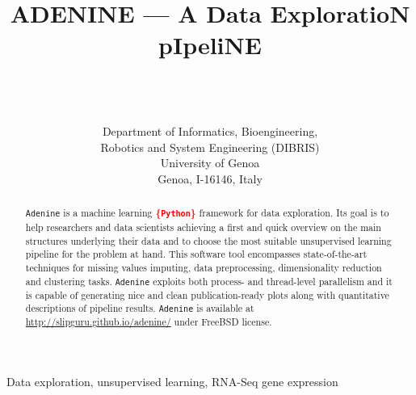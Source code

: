 \documentclass[twoside,11pt]{article}
\makeatletter
\newcommand{\ade}{\texttt{Adenine}\@\xspace}
\newcommand{\py}{\texttt{Python}\@\xspace}
\newcommand{\todo}[1]{\textcolor{red}{{\bf \{#1\}}}} %
\makeatother
\begin{document}
\title{ADENINE --- A Data ExploratioN pIpeliNE}

\author{ \\
 \\
 \\[1em]
\addr Department of Informatics, Bioengineering, \\Robotics and System Engineering (DIBRIS)\\
     University of Genoa\\
     Genoa, I-16146, Italy}



\maketitle

\begin{abstract}

\ade is a machine learning \todo{\py} framework for data exploration. 
Its goal is to help researchers and data scientists achieving a first and quick overview on the main structures underlying their data and to choose the most suitable unsupervised learning pipeline for the problem at hand.
This software tool encompasses state-of-the-art techniques for missing values imputing, data preprocessing, dimensionality reduction and clustering tasks.
\ade exploits both process- and thread-level parallelism and it is capable of generating nice and clean publication-ready plots along with quantitative descriptions of pipeline results. \ade is available at \mbox{\url{http://slipguru.github.io/adenine/}} under FreeBSD license.

\end{abstract}

\begin{keywords}
Data exploration, unsupervised learning, RNA-Seq gene expression
\end{keywords}
\end{document}

